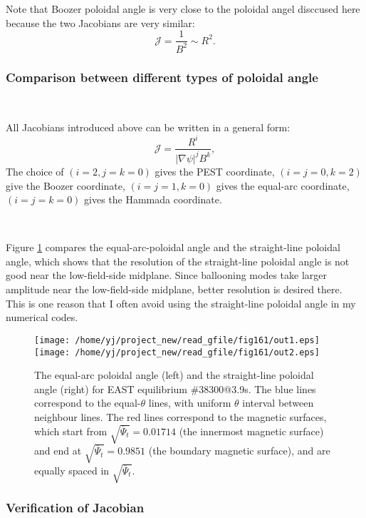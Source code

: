\documentclass{llncs}
\begin{document}
Note that Boozer poloidal angle is very close to the poloidal angel disccused
here because the two Jacobians are very similar:
\begin{equation}
  \mathcal{J} = \frac{1}{B^2} \sim R^2 .
\end{equation}


\subsubsection{Comparison between different types of poloidal angle}

\

All Jacobians introduced above can be written in a general form:
\begin{equation}
  \mathcal{J} = \frac{R^i}{| \nabla \psi |^j B^k},
\end{equation}
The choice of $(i = 2, j = k = 0)$ gives the PEST coordinate, $(i = j = 0, k =
2)$ give the Boozer coordinate, $(i = j = 1, k = 0)$ gives the equal-arc
coordinate, $(i = j = k = 0)$ gives the Hammada coordinate.

\

Figure \ref{8-23-1} compares the equal-arc-poloidal angle and the
straight-line poloidal angle, which shows that the resolution of the
straight-line poloidal angle is not good near the low-field-side midplane.
Since ballooning modes take larger amplitude near the low-field-side midplane,
better resolution is desired there. This is one reason that I often avoid
using the straight-line poloidal angle in my numerical codes.

\begin{figure}[h]
  \texttt{[image: /home/yj/project\_new/read\_gfile/fig161/out1.eps]}\texttt{[image: /home/yj/project\_new/read\_gfile/fig161/out2.eps]}
  \caption{\label{8-23-1}The equal-arc poloidal angle (left) and the
  straight-line poloidal angle (right) for EAST equilibrium \#38300@3.9s. The
  blue lines correspond to the equal-$\theta$ lines, with uniform $\theta$
  interval between neighbour lines. The red lines correspond to the magnetic
  surfaces, which start from $\sqrt{\overline{\Psi}_t} = 0.01714$ (the
  innermost magnetic surface) and end at $\sqrt{\overline{\Psi}_t} = 0.9851$
  (the boundary magnetic surface), and are equally spaced in
  $\sqrt{\overline{\Psi}_t}$.}
\end{figure}

\subsubsection{Verification of Jacobian}
\end{document}
